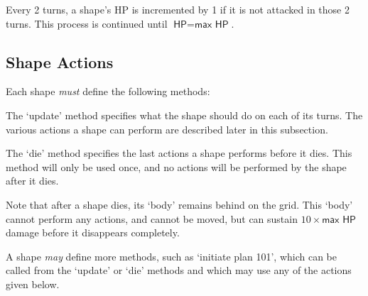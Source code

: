 \documentclass[a4paper,11pt]{article}
\begin{document}
Every 2 turns, a shape's \textsf{HP} is incremented by 1 if it is not attacked in those 2 turns. This process is continued until \(\textsf{HP} = \textsf{max HP}\).

\subsection{Shape Actions} \label{sec:act}

Each shape \emph{must} define the following methods:
\begin{description}
\addtolength{\itemsep}{-4pt}
    \item[update] The `update' method specifies what the shape should do on each of its turns. The various actions a shape can perform are described later in this subsection.
    \item[die] The `die' method specifies the last actions a shape performs before it dies. This method will only be used once, and no actions will be performed by the shape after it dies.
\end{description}

Note that after a shape dies, its `body' remains behind on the grid. This `body' cannot perform any actions, and cannot be moved, but can sustain \(10 \times \textsf{max HP}\) damage before it disappears completely.

A shape \emph{may} define more methods, such as `initiate plan 101', which can be called from the `update' or `die' methods and which may use any of the actions given below.
\end{document}

